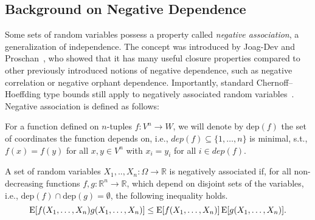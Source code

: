 \subsection{Background on Negative Dependence}
Some sets of random variables possess a property called \emph{negative association}, a generalization of independence.
The concept was introduced by Joag-Dev and Proschan~\cite{joagdev1983}, who showed that it has many useful closure properties compared to other previously introduced notions of negative dependence, such as negative correlation or negative orphant dependence.
Importantly, standard Chernoff--Hoeffding type bounds still apply to negatively associated random variables~\cite[Prop. 7]{dubhashi1998}.
Negative association is defined as follows:
\begin{definition}
For a function defined on $n$-tuples $f: V^n \rightarrow W$, we will denote by $\mathrm{dep}(f)$ the set of coordinates the function depends on, i.e., $dep(f) \subseteq \{1,\ldots,n\}$ is minimal, s.t., $f(x) = f(y)$ for all $x, y \in V^n$ with $x_i = y_i$ for all $i \in dep(f)$.
\end{definition}

\begin{definition}\label{def:neg_assoc}
A set of random variables $X_1,..,X_n: \Omega \rightarrow \mathbb R$ is negatively associated if, for all non-decreasing functions $f,g: \mathbb R^n \rightarrow \mathbb R$, which depend on disjoint sets of the variables, i.e., $\mathrm{dep}(f) \cap \mathrm{dep}(g) = \emptyset$, the following inequality holds.
\[
\operatorname{\mathrm{E}} [f(X_1,\ldots,X_n) g(X_1,\ldots,X_n)] \leq \operatorname{\mathrm{E}} [f(X_1,\ldots,X_n)] \operatorname{\mathrm{E}} [g(X_1,\ldots,X_n)] \textrm{.}
\]
\end{definition}

